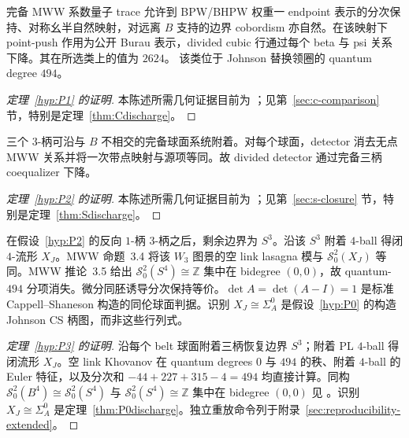 \begin{theorem}[系数比较，C]\label{hyp:P1}
完备 MWW 系数量子 trace 允许到 BPW/BHPW 权重一 endpoint 表示的分次保持、对称幺半自然映射，对远离 $B$ 支持的边界 cobordism 亦自然。在该映射下 point-push 作用为公开 Burau 表示，divided cubic 行通过每个 beta 与 psi 关系下降。其在所选类上的值为 $2624$。
该类位于 Johnson 替换领圈的 quantum degree $494$。
\end{theorem}

\begin{proof}[定理~\ref{hyp:P1} 的证明]
本陈述所需几何证据目前为 \Open；见第~\ref{sec:c-comparison} 节，特别是定理~\ref{thm:Cdischarge}。
\end{proof}

\begin{theorem}[相对三柄闭包，S]\label{hyp:P2}
三个 $3$-柄可沿与 $B$ 不相交的完备球面系统附着。对每个球面，detector 消去无点 MWW 关系并将一次带点映射与源项等同。故 divided detector 通过完备三柄 coequalizer 下降。
\end{theorem}

\begin{proof}[定理~\ref{hyp:P2} 的证明]
本陈述所需几何证据目前为 \Open；见第~\ref{sec:s-closure} 节，特别是定理~\ref{thm:Sdischarge}。
\end{proof}

\begin{theorem}[替换图景的四柄闭包，P3]\label{hyp:P3}
在假设~\ref{hyp:P2} 的反向 $1$-柄 $3$-柄之后，剩余边界为 $S^3$。沿该 $S^3$ 附着 $4$-ball 得闭 $4$-流形 $X_J$。MWW 命题~3.4 将该 $W_3$ 图景的空 link lasagna 模与 $\mathcal S^2_0(X_J)$ 等同。MWW 推论~3.5 给出 $\mathcal S^2_0(S^4)\cong\mathbb Z$ 集中在 bidegree $(0,0)$，故 quantum-$494$ 分项消失。微分同胚诱导分次保持等价。$\det A=\det(A-I)=1$ 是标准 Cappell--Shaneson 构造的同伦球面判据。识别 $X_J\cong\Sigma_A^0$ 是假设~\ref{hyp:P0} 的构造 Johnson CS 柄图，而非这些行列式。
\end{theorem}

\begin{proof}[定理~\ref{hyp:P3} 的证明]
沿每个 belt 球面附着三柄恢复边界 $S^3$；附着 PL $4$-ball 得闭流形 $X_J$。空 link Khovanov 在 quantum degrees $0$ 与 $494$ 的秩、附着 $4$-ball 的 Euler 特征，以及分次和 $-44+227+315-4=494$ 均直接计算。同构 $\mathcal S^2_0(B^4)\cong\mathcal S^2_0(S^4)$ 与 $\mathcal S^2_0(S^4)\cong\mathbb Z$ 集中在 bidegree $(0,0)$ 见 \cite[Proposition~3.4 and Corollary~3.5]{ManolescuWalkerWedrich2023}。识别 $X_J\cong\Sigma_A^0$ 是定理~\ref{thm:P0discharge}。独立重放命令列于附录~\ref{sec:reproducibility-extended}。
\end{proof}

